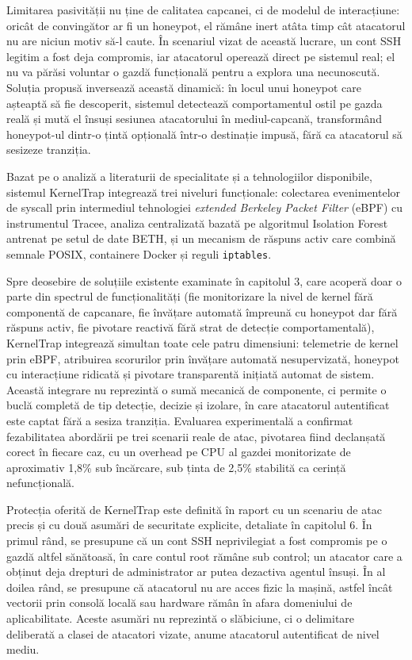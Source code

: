 \documentclass[12pt, a4paper]{report}
\begin{document}
Limitarea pasivității nu ține de calitatea capcanei, ci de modelul de
interacțiune: oricât de convingător ar fi un honeypot, el rămâne inert atâta timp
cât atacatorul nu are niciun motiv să-l caute. În scenariul vizat de această
lucrare, un cont SSH legitim a fost deja compromis, iar atacatorul operează
direct pe sistemul real; el nu va părăsi voluntar o gazdă funcțională pentru a
explora una necunoscută. Soluția propusă inversează această dinamică: în locul
unui honeypot care așteaptă să fie descoperit, sistemul detectează comportamentul
ostil pe gazda reală și mută el însuși sesiunea atacatorului în mediul-capcană,
transformând honeypot-ul dintr-o țintă opțională într-o destinație impusă, fără
ca atacatorul să sesizeze tranziția.

Bazat pe o analiză a literaturii de specialitate și a tehnologiilor disponibile, sistemul KernelTrap integrează trei niveluri funcționale:
colectarea evenimentelor de syscall prin intermediul tehnologiei \textit{extended Berkeley Packet Filter} (eBPF) cu instrumentul Tracee,
analiza centralizată bazată pe algoritmul Isolation Forest antrenat pe setul de date BETH, și un mecanism de răspuns activ care combină semnale POSIX,
containere Docker și reguli \texttt{iptables}.

Spre deosebire de soluțiile existente examinate în capitolul 3, care acoperă doar o parte din spectrul de funcționalități (fie monitorizare la nivel de kernel
fără componentă de capcanare, fie învățare automată împreună cu honeypot dar fără răspuns activ, fie pivotare reactivă fără strat de detecție comportamentală),
KernelTrap integrează simultan toate cele patru dimensiuni: telemetrie de kernel prin eBPF, atribuirea scorurilor prin învățare automată nesupervizată,
honeypot cu interacțiune ridicată și pivotare transparentă inițiată automat de sistem. Această integrare nu reprezintă o sumă mecanică de componente,
ci permite o buclă completă de tip detecție, decizie și izolare, în care atacatorul autentificat este captat fără a sesiza tranziția.
Evaluarea experimentală a confirmat fezabilitatea abordării pe trei scenarii reale de atac, pivotarea fiind declanșată corect în fiecare caz,
cu un overhead pe CPU al gazdei monitorizate de aproximativ 1,8\% sub încărcare, sub ținta de 2,5\% stabilită ca cerință nefuncțională.

Protecția oferită de KernelTrap este definită în raport cu un scenariu de atac
precis și cu două asumări de securitate explicite, detaliate în capitolul 6. În
primul rând, se presupune că un cont SSH neprivilegiat a fost compromis pe o
gazdă altfel sănătoasă, în care contul root rămâne sub control; un atacator care
a obținut deja drepturi de administrator ar putea dezactiva agentul însuși. În al
doilea rând, se presupune că atacatorul nu are acces fizic la mașină, astfel
încât vectorii prin consolă locală sau hardware rămân în afara domeniului de
aplicabilitate. Aceste asumări nu reprezintă o slăbiciune, ci o delimitare
deliberată a clasei de atacatori vizate, anume atacatorul autentificat de nivel
mediu.
\end{document}
